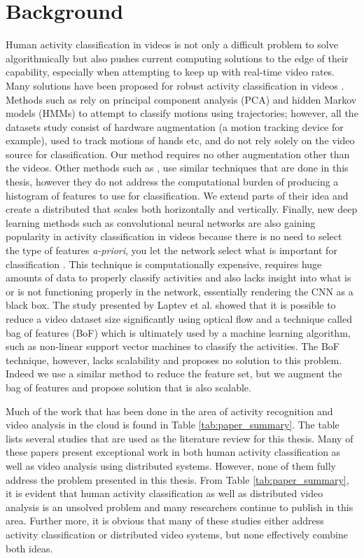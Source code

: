 \chapter{Background}
Human activity classification in videos is not only a difficult problem to solve
algorithmically but also pushes current computing solutions to the edge of their
capability, especially when attempting to keep up with real-time video rates.
Many solutions have been proposed for robust activity classification in videos
\cite{niebles2010modeling} \cite{bashir2007object} \cite{ribeiro2005human}
\cite{karpathy2014large}. Methods such as \cite{bashir2007object} rely on
principal component analysis (PCA) and hidden Markov models (HMMs) to attempt to
classify motions using trajectories; however, all the datasets study consist of
hardware augmentation (a motion tracking device for example), used to track
motions of hands etc, and do not rely solely on the video source for
classification. Our method requires no other augmentation  other than the
videos.  Other methods such as \cite{niebles2010modeling}, use similar
techniques that are done in this thesis, however they do not address the
computational burden of producing a histogram of features to use for
classification. We extend parts of their idea and create a  distributed that
scales both horizontally and vertically. Finally, new deep learning methods such
as convolutional neural networks are also gaining popularity in activity
classification in videos because there is no need to select the type of features
\textit{a-priori}, you let the network select what is important for
classification \cite{karpathy2014large}. This technique is computationally
expensive, requires huge amounts of data to properly classify activities
\cite{karpathy2014large} and also lacks insight into what is or is not
functioning properly  in the network, essentially rendering the CNN as a black
box. The study presented by Laptev et al. \cite{laptev2008learning} showed that
it is possible to reduce a video dataset size significantly using optical flow
and a technique called bag of features (BoF) which is ultimately used by a
machine learning algorithm, such as non-linear support vector machines to
classify the activities. The BoF technique, however, lacks scalability and
proposes no solution to this problem. Indeed we use a similar method to
reduce the feature set, but we augment the bag of features and propose
solution that is also scalable.

Much of the work that has been done in the area of activity recognition and
video analysis in the cloud is found in Table \ref{tab:paper_summary}. The table
lists several studies that are used as the literature review for this thesis.
Many of these papers present exceptional work in both human activity
classification as well as video analysis using distributed systems. However,
none of them fully address the problem presented in this thesis. From Table
\ref{tab:paper_summary}, it is evident that human activity classification as
well as distributed video analysis is an unsolved problem and many researchers
continue to publish in this area. Further more, it is obvious that many of these
studies either address activity classification or distributed video systems, but
none effectively combine both ideas.


